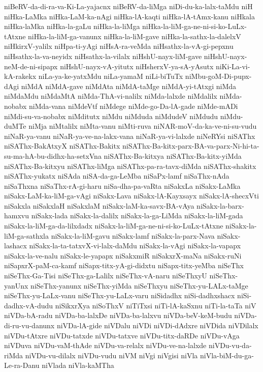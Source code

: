 {niBeRV-da-di-ra-va-Ki-La-yajacnx
niBeRV-da-liMga
niDi-du-ka-lalx-taMdu
niH
niHka-LaMka
niHka-LaM-ka-nAgi
niHka-lA-kaqti
niHka-lA-tAmx-kanu
niHkala
niHka-laMka
niHka-la-gaLu
niHka-la-liMga
niHka-la-liM-ga-ne-ni-si-ko-LuLx-tAtxne
niHka-la-liM-ga-vanunx
niHka-la-liM-gave
niHka-la-sathx-la-dalelxV
niHkirxV-yalilx
niHpa-ti-yAgi
niHsA-ra-veMda
niHsathx-la-vA-gi-pepxnu
niHsathx-la-va-neyidx
niHsathx-la-vilalx
niHshU-nayx-liM-gave
niHshU-nayx-neM-de-ni-sipapx
niHshU-nayx-vA-yitutx
niHsherxV-ya-sA-yAsutx
niKi-La-vi-kA-rakekx
niLa-ya-ke-yatxMdu
niLa-yamaM
niLi-biTuTx
niMbu-goM-Di-pupx-dAgi
niMdA
niMdA-gave
niMdAta
niMdA-taMge
niMdA-yi-tAtxgi
niMda
niMdaMdu
niMdaMtA
niMda-ThA-vi-nalilx
niMda-lalxde
niMdalilx
niMda-nobabx
niMda-vana
niMdeVtf
niMdege
niMde-go-Da-lA-gade
niMde-mADi
niMdi-su-va-nobabx
niMditutx
niMdu
niMduda
niMdudeV
niMdudu
niMdu-duMTe
niMja
niMtalilx
niMta-vanu
niMti-ruva
niNAR-moV-da-ka-ve-ni-su-vudu
niNaR-ya-vanu
niNaR-ya-ve-na-lakx-vana
niNaR-ya-vi-lalxde
niNeRYsi
niSAThx
niSAThx-BakAtxyX
niSAThx-Bakitx
niSAThx-Ba-kitx-parx-BA-va-parx-Ni-hi-ta-su-ma-hA-bu-didhx-ha-setxVna
niSAThx-Ba-kitxya
niSAThx-Ba-kitx-yiMda
niSAThx-Ba-kitxyu
niSAThx-liMga
niSAThx-pa-ra-tavx-diMda
niSAThx-shakitx
niSAThx-yukatx
niSAda
niSA-da-ga-LeMba
niSaPx-lamf
niSaThx-nAda
niSaThxna
niSaThx-rA-gi-haru
niSa-dha-pa-vaRta
niSakxLa
niSakx-LaMka
niSakx-LaM-ka-liM-ga-vAgi
niSakx-Lava
niSakx-lA-Kayxsayx
niSakx-lA-shecxVti
niSakxla
niSakxlaH
niSakxlaM
niSakx-laM-ka-savx-BA-vAya
niSakx-la-barx-hamxvu
niSakx-lada
niSakx-la-dalilx
niSakx-la-ga-LiMda
niSakx-la-liM-gada
niSakx-la-liM-ga-da-lilxdadx
niSakx-la-liM-ga-ne-ni-si-ko-LuLx-tAtxne
niSakx-la-liM-ga-sathxla
niSakx-la-liM-gavu
niSakx-lamf
niSakx-la-parx-Nava
niSakx-lashacx
niSakx-la-ta-tatxvX-vi-lalx-daMdu
niSakx-la-vAgi
niSakx-la-vapapx
niSakx-la-ve-nalu
niSakx-le-yapapx
niSakxmiR
niSakxrX-maNa
niSakx-ruNi
niSapxrX-paM-ca-kamf
niSapx-titx-yA-gi-didxtu
niSapx-titx-yeMba
niSeThx
niSeThx-Ga-Tisi
niSeThx-ga-Lalilx
niSeThx-vA-naru
niSeThxyU
niSeThx-yanUnx
niSeThx-yanunx
niSeThx-yiMda
niSeThxyu
niSeThx-yu-LALx-taMge
niSeThx-yu-LaLx-vanu
niSeThx-yu-LaLx-varu
niSidadhx
niSi-dadhxshacx
niSi-dadhx-vA-dudu
niSikxrXya
niSoThxV
niTiTxsi
niTi-lA-kaSxnu
niTi-la-taTa
niV
niVDa-bA-radu
niVDa-ba-lalxDe
niVDa-ba-lalxvu
niVDa-beV-keM-budu
niVDa-di-ru-vu-danunx
niVDa-lA-gide
niVDalu
niVDi
niVDi-dAdxre
niVDida
niVDilalx
niVDu-tAtxre
niVDu-tatxde
niVDu-tatxve
niVDu-titx-daRDe
niVDu-vAga
niVDuva
niVDu-vaM-thAde
niVDu-va-relalx
niVDu-ve-na-lalxde
niVDu-vu-da-riMda
niVDu-vu-dilalx
niVDu-vudu
niVM
niVgi
niVgisi
niVla
niVla-biM-du-ga-Le-ra-Danu
niVlada
niVla-kaMTha
}
